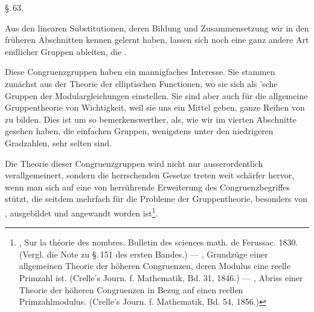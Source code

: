 


\S.\,63.


Aus den linearen Substitutionen, deren Bildung und Zusammensetzung wir in den früheren Abschnitten kennen gelernt haben, lassen sich noch eine ganz andere Art endlicher Gruppen ableiten, die .

Diese Congruenzgruppen haben ein mannigfaches Interesse. Sie stammen zunächst aus der Theorie der elliptischen Functionen, wo sie sich als 'sche Gruppen der Modulargleichungen einstellen. Sie sind aber auch für die allgemeine Gruppentheorie von Wichtigkeit, weil sie uns ein Mittel geben, ganze Reihen von  zu bilden. Dies ist um so bemerkenswerther, als, wie wir im vierten Abschnitte gesehen haben, die einfachen Gruppen, wenigstens unter den niedrigeren Gradzahlen, sehr selten sind.

Die Theorie dieser Congruenzgruppen wird nicht nur ausserordentlich verallgemeinert, sondern die herrschenden Gesetze treten weit schärfer hervor, wenn man sich auf eine von  herrührende Erweiterung des Congruenzbegriffes stützt, die seitdem mehrfach für die Probleme der Gruppentheorie, besonders von , ausgebildet und angewandt worden ist\footnote{, \glqq Sur la théorie des nombres\grqq{}. Bulletin des sciences math. de Ferussac. 1830. (Vergl. die Note zu \S.\,151 des ersten Bandes.) --- , Grundzüge einer allgemeinen Theorie der höheren Congruenzen, deren Modulus eine reelle Primzahl ist. (Crelle's Journ. f. Mathematik, Bd. 31, 1846.) --- , Abriss einer Theorie der höheren Congruenzen in Bezug auf einen reellen Primzahlmodulus. (Crelle's Journ. f. Mathematik, Bd. 54, 1856.)}.
